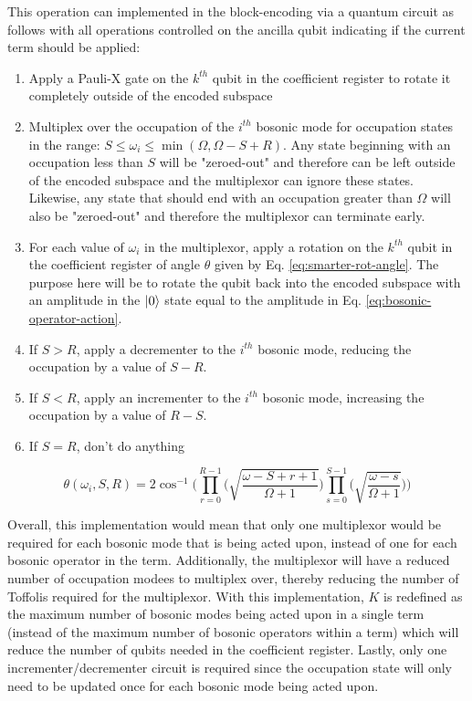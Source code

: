 \begin{tcolorbox}
    This operation can implemented in the block-encoding via a quantum circuit as follows with all operations controlled on the ancilla qubit indicating if the current term should be applied:
    \begin{enumerate}
        \item Apply a Pauli-X gate on the $k^{th}$ qubit in the coefficient register to rotate it completely outside of the encoded subspace
        \item Multiplex over the occupation of the $i^{th}$ bosonic mode for occupation states in the range: $S \leq \omega_i \leq \min(\Omega, \Omega - S + R)$. Any state beginning with an occupation less than $S$ will be "zeroed-out" and therefore can be left outside of the encoded subspace and the multiplexor can ignore these states. Likewise, any state that should end with an occupation greater than $\Omega$ will also be "zeroed-out" and therefore the multiplexor can terminate early.
        \item For each value of $\omega_i$ in the multiplexor, apply a rotation on the $k^{th}$ qubit in the coefficient register of angle $\theta$ given by Eq. \ref{eq:smarter-rot-angle}. The purpose here will be to rotate the qubit back into the encoded subspace with an amplitude in the $\ket{0}$ state equal to the amplitude in Eq. \ref{eq:bosonic-operator-action}. 
        \item If $S > R$, apply a decrementer to the $i^{th}$ bosonic mode, reducing the occupation by a value of $S - R$.
        \item If $S < R$, apply an incrementer to the $i^{th}$ bosonic mode, increasing the occupation by a value of $R - S$.
        \item If $S = R$, don't do anything
    \end{enumerate}

    \begin{equation}
        \label{eq:smarter-rot-angle}
        \theta(\omega_i, S, R) = 2 \cos^{-1}{\Big(\prod_{r=0}^{R-1} \big( \sqrt{\frac{\omega - S + r + 1}{\Omega + 1}} \big) \prod_{s=0}^{S-1} \big( \sqrt{\frac{\omega - s}{\Omega + 1}} \big)\Big)}
    \end{equation}

    Overall, this implementation would mean that only one multiplexor would be required for each bosonic mode that is being acted upon, instead of one for each bosonic operator in the term.
    Additionally, the multiplexor will have a reduced number of occupation modees to multiplex over, thereby reducing the number of Toffolis required for the multiplexor.
    With this implementation, $K$ is redefined as the maximum number of bosonic modes being acted upon in a single term (instead of the maximum number of bosonic operators within a term) which will reduce the number of qubits needed in the coefficient register.
    Lastly, only one incrementer/decrementer circuit is required since the occupation state will only need to be updated once for each bosonic mode being acted upon.
\end{tcolorbox}


